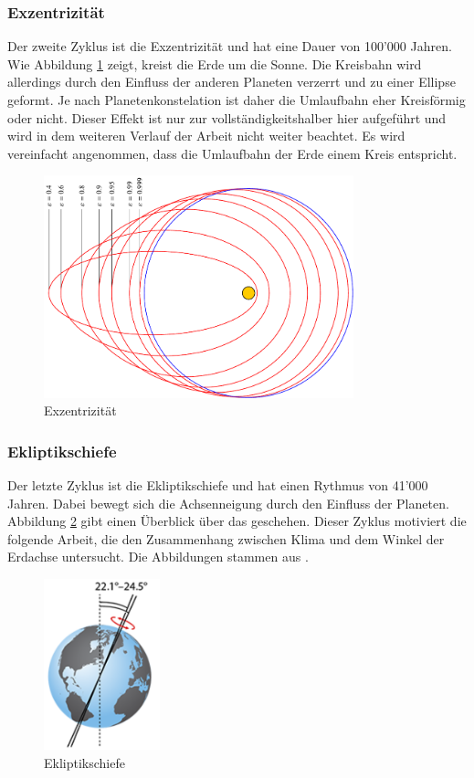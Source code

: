 \begin{refsection}
\subsubsection{Exzentrizität}
Der zweite Zyklus ist die Exzentrizität und hat eine Dauer von 100'000 Jahren. Wie Abbildung \ref{fig:abb2} zeigt, kreist die Erde um die Sonne. Die Kreisbahn wird allerdings durch den Einfluss der anderen Planeten verzerrt und zu einer Ellipse geformt. Je nach Planetenkonstelation ist daher die Umlaufbahn eher Kreisförmig oder nicht. Dieser Effekt ist nur zur vollständigkeitshalber hier aufgeführt und wird in dem weiteren Verlauf der Arbeit nicht weiter beachtet. Es wird vereinfacht angenommen, dass die Umlaufbahn der Erde einem Kreis entspricht. 
%
\begin{figure}
	\centering
	\includegraphics[width= 0.8\textwidth]{neigung/erdbahn.pdf}
	\caption[Exzentrizität]{Exzentrizität}
	\label{fig:abb2}
\end{figure}

\subsubsection{Ekliptikschiefe}
Der letzte Zyklus ist die Ekliptikschiefe und hat einen Rythmus von 41'000 Jahren. Dabei bewegt sich die Achsenneigung durch den Einfluss der Planeten. Abbildung \ref{fig:abb3} gibt einen Überblick über das geschehen. Dieser Zyklus motiviert die folgende Arbeit, die den Zusammenhang zwischen Klima und dem Winkel der Erdachse untersucht. Die Abbildungen stammen aus \cite{fm}.
%
\begin{figure}
	\centering
	\includegraphics[width= 0.3\textwidth]{neigung/Obliquity.png}
	\caption[Ekliptikschiefe]{Ekliptikschiefe}
	\label{fig:abb3}
\end{figure}
%


\end{refsection}
